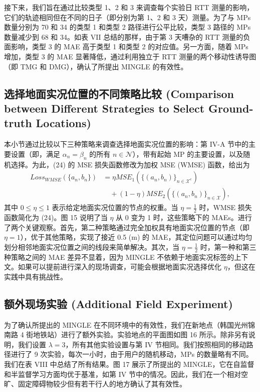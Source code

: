 \documentclass[journal]{IEEEtran}
\begin{document}
接下来，我们旨在通过比较类型 1、2 和 3 来调查每个实验日 RTT 测量的影响，它们的轨迹相同但在不同的日子（即分别为第 1、2 和 3 天）测量。为了与 MPs 数量分别为 70 和 34 的类型 1 和类型 2 路径进行公平比较，类型 3 路径的 MPs 数量减少到 68 和 34。如表 VII 总结的那样，由于第 3 天嘈杂的 RTT 测量的负面影响，类型 3 的 MAE 高于类型 1 和类型 2 的对应值。另一方面，随着 MPs 增加，类型 3 的 MAE 显著降低，通过利用独立于 RTT 测量的两个移动性诱导图（即 TMG 和 DMG），确认了所提出 MINGLE 的有效性。

\subsection{选择地面实况位置的不同策略比较 (Comparison between Different Strategies to Select Ground-truth Locations)}
本小节通过比较以下三种策略来调查选择地面实况位置的影响：第 IV-A 节中的主要设置（即，满足 $\alpha_n = \beta_n$ 的所有 $n \in \mathcal{N}$），带有起始 MP 的主要设置，以及随机选择。为此，(24) 的 MSE 损失函数修改为加权 MSE (WMSE) 函数，给出为
\begin{align}
Loss_{WMSE}(\{a_n, b_n\}) &= \eta MSE_1(\{(a_n, b_n)\}_{n\in\mathcal{X}^c}) \nonumber \\
&\quad + (1 - \eta)MSE_2(\{(a_n, b_n)\}_{n\in\mathcal{X}}), \label{eq:33}
\end{align}
其中 $0 \le \eta \le 1$ 表示给定地面实况位置的节点的权重。当 $\eta = \frac{1}{2}$ 时，WMSE 损失函数简化为 (24)。图 15 说明了当 $\eta$ 从 0 变为 1 时，这些策略下的 MAEs。进行了两个关键观察。首先，第二种策略通过完全加权具有地面实况位置的节点（即 $\eta = 1$），优于其他策略，实现了接近 0.5 (m) 的 MAE，其定位问题可以通过均匀划分相邻地面实况位置之间的线段来简单解决。其次，当 $\eta = \frac{1}{2}$ 时，第一种和第三种策略之间的 MAE 差异不显着，因为 MINGLE 不依赖于地面实况标签的上下文。如果可以提前进行深入的现场调查，可能会根据地面实况选择优化 $\eta$，但这在实践中具有挑战性。

\subsection{额外现场实验 (Additional Field Experiment)}
为了确认所提出的 MINGLE 在不同环境中的有效性，我们在新地点（韩国光州锦南路 4 街地铁站）进行了额外实验。实验地点的平面图如图 16 所示。除非另有说明，我们设置 $\lambda = 3$，所有其他实验设置与第 IV 节相同。我们按照相同的移动路径进行了 9 次实验，每次一小时，由于用户的随机移动，MPs 的数量略有不同。我们在表 VIII 中总结了所有结果。图 17 展示了所提出的 MINGLE，它在自监督和半监督学习方面均优于基准，如第 IV 节中的情况。因此，我们在一个相对空旷、固定障碍物较少但有若干行人的地方确认了其有效性。
\end{document}
